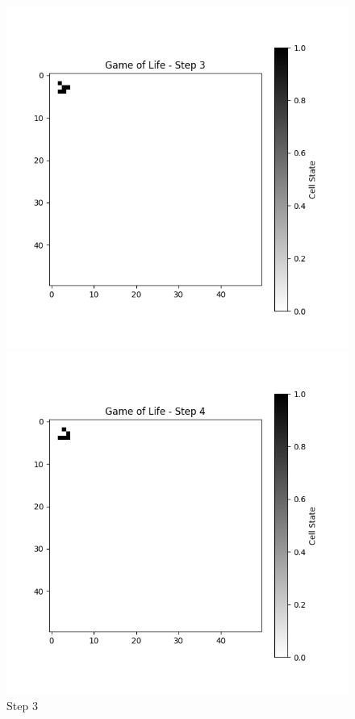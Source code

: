 \documentclass[10pt,letterpaper, onecolumn]{report}
\begin{document}
\begin{flushleft}
\begin{flushleft}
\begin{figure}[htbp!]
                        \begin{minipage}{0.3\textwidth}
                            \centering
                            \includegraphics[width=\textwidth]{../game_of_life_step_Game of Life - Step 3}
                            \caption{Step 3}
                        \end{minipage}%
                        \begin{minipage}{0.3\textwidth}
                            \centering
                            \includegraphics[width=\textwidth]{../game_of_life_step_Game of Life - Step 4}

\end{minipage}
\end{figure}
\end{flushleft}
\end{flushleft}
\end{document}
